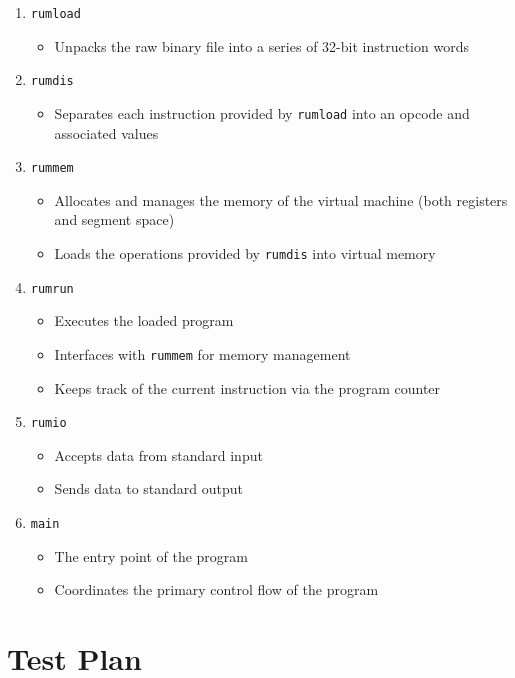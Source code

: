 \documentclass{article}
\begin{document}
\begin{enumerate}
    \item \verb|rumload|
          \begin{itemize}
              \item Unpacks the raw binary file into a series of 32-bit instruction words
          \end{itemize}
    \item \verb|rumdis|
          \begin{itemize}
              \item Separates each instruction provided by \verb|rumload| into an opcode and associated values
          \end{itemize}
    \item \verb|rummem|
          \begin{itemize}
              \item Allocates and manages the memory of the virtual machine (both registers and segment space)
              \item Loads the operations provided by \verb|rumdis| into virtual memory
          \end{itemize}
    \item \verb|rumrun|
          \begin{itemize}
              \item Executes the loaded program
              \item Interfaces with \verb|rummem| for memory management
              \item Keeps track of the current instruction via the program counter
          \end{itemize}
    \item \verb|rumio|
          \begin{itemize}
              \item Accepts data from standard input
              \item Sends data to standard output
          \end{itemize}
    \item \verb|main|
          \begin{itemize}
              \item The entry point of the program
              \item Coordinates the primary control flow of the program
          \end{itemize}
\end{enumerate}

\section{Test Plan}
\end{document}
